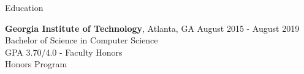 \documentclass{resume} %
\begin{document}
\begin{rSection}{Education}

  \textbf{Georgia Institute of Technology}, Atlanta, GA \hfill {August 2015 - August 2019}
  \\ Bachelor of Science in Computer Science
  \\ GPA 3.70/4.0 - Faculty Honors
  \\ Honors Program

\end{rSection}

\end{document}
